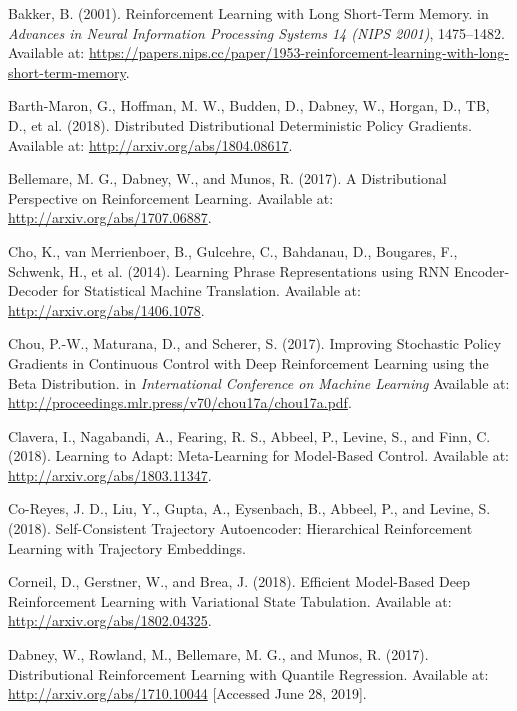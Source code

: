\documentclass[
  letterpaper,
  DIV=11,
  numbers=noendperiod]{scrreprt}
\newlength{\cslhangindent}
\newlength{\cslentryspacingunit} %
\newenvironment{CSLReferences}[2] %
 {%
  \setlength{\parindent}{0pt}
  \ifodd #1
  \let\oldpar\par
  \def\par{\hangindent=\cslhangindent\oldpar}
  \fi
  \setlength{\parskip}{#2\cslentryspacingunit}
 }%
 {}
\begin{document}
\begin{CSLReferences}{1}{0}
\leavevmode{}%
Bakker, B. (2001). Reinforcement {Learning} with {Long Short-Term
Memory}. in \emph{Advances in {Neural Information Processing Systems} 14
({NIPS} 2001)}, 1475--1482. Available at:
\url{https://papers.nips.cc/paper/1953-reinforcement-learning-with-long-short-term-memory}.

\leavevmode{}%
Barth-Maron, G., Hoffman, M. W., Budden, D., Dabney, W., Horgan, D., TB,
D., et al. (2018). Distributed {Distributional Deterministic Policy
Gradients}. Available at: \url{http://arxiv.org/abs/1804.08617}.

\leavevmode{}%
Bellemare, M. G., Dabney, W., and Munos, R. (2017). A {Distributional
Perspective} on {Reinforcement Learning}. Available at:
\url{http://arxiv.org/abs/1707.06887}.

\leavevmode{}%
Cho, K., van Merrienboer, B., Gulcehre, C., Bahdanau, D., Bougares, F.,
Schwenk, H., et al. (2014). Learning {Phrase Representations} using {RNN
Encoder-Decoder} for {Statistical Machine Translation}. Available at:
\url{http://arxiv.org/abs/1406.1078}.

\leavevmode{}%
Chou, P.-W., Maturana, D., and Scherer, S. (2017). Improving {Stochastic
Policy Gradients} in {Continuous Control} with {Deep Reinforcement
Learning} using the {Beta Distribution}. in \emph{International
{Conference} on {Machine Learning}} Available at:
\url{http://proceedings.mlr.press/v70/chou17a/chou17a.pdf}.

\leavevmode{}%
Clavera, I., Nagabandi, A., Fearing, R. S., Abbeel, P., Levine, S., and
Finn, C. (2018). Learning to {Adapt}: {Meta-Learning} for {Model-Based
Control}. Available at: \url{http://arxiv.org/abs/1803.11347}.

\leavevmode{}%
Co-Reyes, J. D., Liu, Y., Gupta, A., Eysenbach, B., Abbeel, P., and
Levine, S. (2018). Self-{Consistent Trajectory Autoencoder}:
{Hierarchical Reinforcement Learning} with {Trajectory Embeddings}.

\leavevmode{}%
Corneil, D., Gerstner, W., and Brea, J. (2018). Efficient {Model-Based
Deep Reinforcement Learning} with {Variational State Tabulation}.
Available at: \url{http://arxiv.org/abs/1802.04325}.

\leavevmode{}%
Dabney, W., Rowland, M., Bellemare, M. G., and Munos, R. (2017).
Distributional {Reinforcement Learning} with {Quantile Regression}.
Available at: \url{http://arxiv.org/abs/1710.10044} {[}Accessed June 28,
2019{]}.


\end{CSLReferences}
\end{document}
